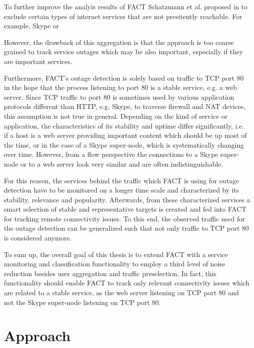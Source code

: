 \documentclass{sigcomm-alternate}
\begin{document}
To further improve the analyis results of FACT Schatzmann et al. 
proposed in \cite{MyPhDThesis} to exclude certain types of 
internet services that are not presitently reachable. For example, 
Skype or 





However, the drawback of this aggregation is that the approach is too
coarse grained to track service outages which may be also important,
especially if they are important services.

Furthermore, FACT's outage detection is solely based on traffic to
TCP port 80 in the hope that the process listening to port 80 is a
stable service, e.g. a web server. Since TCP traffic to port 80 is
sometimes used by various application protocols different than HTTP,
e.g. Skype, to traverse firewall and NAT devices, this assumption is
not true in general. Depending on the kind of service or application,
the characteristics of its stability and uptime differ significantly,
i.e. if a host is a web server providing important content which should
be up most of the time, or in the case of a Skype super-node, which is
systematically changing over time. However, from a flow perspective the
connections to a Skype super-node or to a web server look very similar
and are often indistinguishable.

For this reason, the services behind the traffic which FACT is using
for outage detection have to be monitored on a longer time scale and
characterized by its stability, relevance and popularity. Afterwards,
from these characterized services a smart selection of stable and
representative targets is created and fed into FACT for tracking remote
connectivity issues. To this end, the observed traffic used for the
outage detection can be generalized such that not only traffic to TCP
port 80 is considered anymore.

To sum up, the overall goal of this thesis is to extend FACT with
a service monitoring and classification functionality to employ a
third level of noise reduction besides user aggregation and traffic
preselection. In fact, this functionality should enable FACT to track
only relevant connectivity issues which are related to a stable service,
as the web server listening on TCP port 80 and not the Skype super-node
listening on TCP port 80.

\section{Approach}
\end{document}
